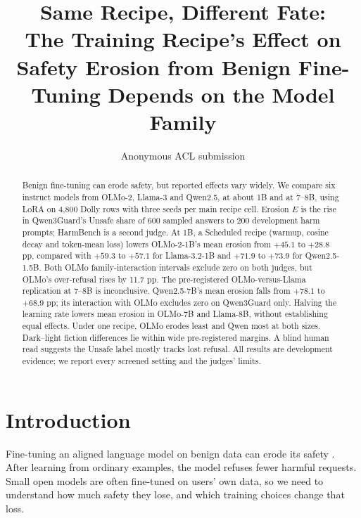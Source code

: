 \documentclass[11pt]{article}
\title{Same Recipe, Different Fate:\\
The Training Recipe's Effect on Safety Erosion from Benign Fine-Tuning Depends on the Model Family}
\author{Anonymous ACL submission}
\begin{document}
\maketitle

\begin{abstract}
  Benign fine-tuning can erode safety, but reported effects vary widely. We
  compare six instruct models from OLMo-2, Llama-3 and Qwen2.5, at about 1B
  and at 7--8B, using LoRA on 4,800 Dolly rows with three seeds per main
  recipe cell. Erosion $E$ is the rise in Qwen3Guard's Unsafe share of 600
  sampled answers to 200 development harm prompts; HarmBench is a second
  judge. At 1B, a Scheduled recipe (warmup, cosine decay and token-mean loss)
  lowers OLMo-2-1B's mean erosion from $+45.1$ to $+28.8$ pp, compared with
  $+59.3$ to $+57.1$ for Llama-3.2-1B and $+71.9$ to $+73.9$ for
  Qwen2.5-1.5B. Both OLMo family-interaction intervals exclude zero on both
  judges, but OLMo's over-refusal rises by 11.7 pp. The pre-registered
  OLMo-versus-Llama replication at 7--8B is inconclusive. Qwen2.5-7B's mean
  erosion falls from $+78.1$ to $+68.9$ pp; its interaction with OLMo excludes
  zero on Qwen3Guard only. Halving the learning rate lowers mean erosion in
  OLMo-7B and Llama-8B, without establishing equal effects. Under one recipe,
  OLMo erodes least and Qwen most at both sizes. Dark--light fiction
  differences lie within wide pre-registered margins. A blind human read
  suggests the Unsafe label mostly tracks lost refusal. All results are
  development evidence; we report every screened setting and the judges'
  limits.
\end{abstract}

\section{Introduction}
\label{sec:intro}

Fine-tuning an aligned language model on benign data can erode its safety
\citep{qi2024finetuning,he2024safe}. After learning from ordinary examples,
the model refuses fewer harmful requests. Small open models are often
fine-tuned on users' own data, so we need to understand how much safety
they lose, and which training choices change that loss.
\end{document}
